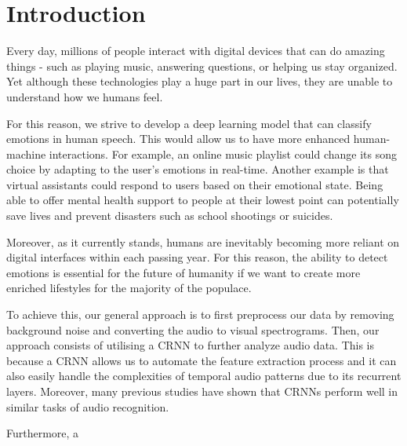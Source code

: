 \documentclass[../main.tex]{subfiles}
\begin{document}
\section{Introduction}
Every day, millions of people interact with digital devices that can do amazing 
things - such as playing music, answering questions, or helping us stay organized. 
Yet although these technologies play a huge part in our lives, they are unable to 
understand how we humans feel. 

For this reason, we strive to develop a deep learning model that can classify 
emotions in human speech. This would allow us to have more enhanced 
human-machine interactions. For example, an online music playlist could 
change its song choice by adapting to the user's emotions in real-time. Another 
example is that virtual assistants could respond to users based on their 
emotional state. Being able to offer mental health support to people at their 
lowest point can potentially save lives and prevent disasters such as school 
shootings or suicides.

Moreover, as it currently stands, humans are inevitably becoming more reliant on 
digital interfaces within each passing year. For this reason, the ability to
detect emotions is essential for the future of humanity if we want to create
more enriched lifestyles for the majority of the populace.

To achieve this, our general approach is to first preprocess our data by removing
background noise and converting the audio to visual spectrograms. Then, our approach
consists of utilising a CRNN to further analyze audio data. This is because a CRNN
allows us to automate the feature extraction process and it can also easily handle
the complexities of temporal audio patterns due to its recurrent layers. Moreover,
many previous studies have shown that CRNNs perform well in similar tasks of audio
recognition.

Furthermore, a
\end{document}
